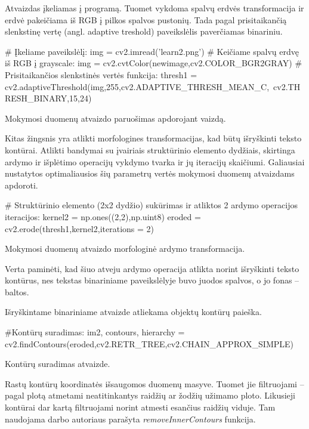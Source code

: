 \documentclass[a4paper,12pt]{article}
\begin{document}
Atvaizdas įkeliamas į programą. Tuomet vykdoma spalvų erdvės transformacija ir erdvė pakeičiama iš RGB į pilkos spalvos pustonių. Tada pagal prisitaikančią slenkstinę vertę (angl. adaptive treshold) paveikslėlis paverčiamas binariniu.
	\begin{listing}[H]
\begin{pythoncode}
# Įkeliame paveikslėlį:
img = cv2.imread('learn2.png')
# Keičiame spalvų erdvę iš RGB į grayscale:
img = cv2.cvtColor(newimage,cv2.COLOR_BGR2GRAY)
# Prisitaikančios slenkstinės vertės funkcija:
thresh1 = cv2.adaptiveThreshold(img,255,cv2.ADAPTIVE_THRESH_MEAN_C,\
	cv2.THRESH_BINARY,15,24)
\end{pythoncode}
		\caption{Mokymosi duomenų atvaizdo paruošimas apdorojant vaizdą.}		
	\end{listing}

Kitas žingsnis yra atlikti morfologines transformacijas, kad būtų išryškinti teksto kontūrai. Atlikti bandymai su įvairiais struktūrinio elemento dydžiais, skirtinga ardymo ir išplėtimo operacijų vykdymo tvarka ir jų iteracijų skaičiumi. Galiausiai nustatytos optimaliausios šių parametrų vertės mokymosi duomenų atvaizdams apdoroti.
	\begin{listing}[H]
\begin{pythoncode}
# Struktūrinio elemento (2x2 dydžio) sukūrimas ir atliktos 2 ardymo operacijos iteracijos: 
kernel2 = np.ones((2,2),np.uint8)		
eroded = cv2.erode(thresh1,kernel2,iterations = 2)
\end{pythoncode}
		\caption{Mokymosi duomenų atvaizdo morfologinė ardymo transformacija.}		
	\end{listing}

Verta paminėti, kad šiuo atveju ardymo operacija atlikta norint išryškinti teksto kontūrus, nes tekstas binariniame paveikslėlyje buvo juodos spalvos, o jo fonas – baltos.

Išryškintame binariniame atvaizde atliekama objektų kontūrų paieška.
	\begin{listing}[H]
\begin{pythoncode}
#Kontūrų suradimas:
im2, contours, hierarchy = cv2.findContours(eroded,cv2.RETR_TREE,cv2.CHAIN_APPROX_SIMPLE)
\end{pythoncode}
	\caption{Kontūrų suradimas atvaizde.}		
	\end{listing}
	
Rastų kontūrų koordinatės išsaugomos duomenų masyve. Tuomet jie filtruojami – pagal plotą atmetami neatitinkantys raidžių ar žodžių užimamo ploto. Likusieji kontūrai dar kartą filtruojami norint atmesti esančius raidžių viduje. Tam naudojama darbo autoriaus parašyta \textit{removeInnerContours} funkcija.
\end{document}
